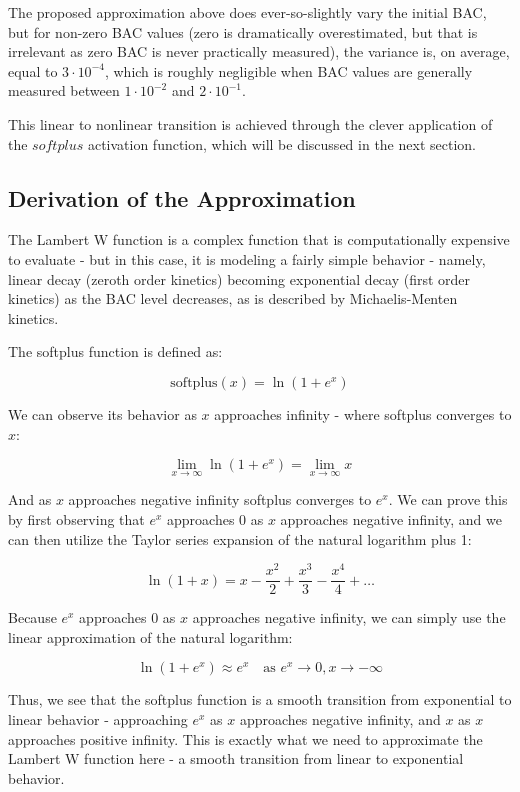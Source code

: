 \documentclass[12pt]{article}
\begin{document}
The proposed approximation above does ever-so-slightly vary the initial BAC, but for non-zero BAC values (zero is dramatically overestimated, but that is irrelevant as zero BAC is never practically measured), the variance is, on average, equal to $3 \cdot 10^{-4}$, which is roughly negligible when BAC values are generally measured between $1 \cdot 10^{-2}$ and $2 \cdot 10^{-1}$.

This linear to nonlinear transition is achieved through the clever application of the $softplus$ activation function, which will be discussed in the next section.

\subsection {Derivation of the Approximation}

The Lambert W function is a complex function that is computationally expensive to evaluate - but in this case, it is modeling a fairly simple behavior - namely, linear decay (zeroth order kinetics) becoming exponential decay (first order kinetics) as the BAC level decreases, as is described by Michaelis-Menten kinetics.

The softplus function is defined as:

\[
    \mathrm{softplus}(x) = \ln(1 + e^x)
\]

We can observe its behavior as $x$ approaches infinity - where softplus converges to $x$:

\[
    \lim_{x \to \infty} \ln(1 + e^x) = \lim_{x \to \infty} x
\]

And as $x$ approaches negative infinity softplus converges to $e^x$. We can prove this by first observing that $e^x$ approaches 0 as $x$ approaches negative infinity, and we can then utilize the Taylor series expansion of the natural logarithm plus 1:

\[
    \ln(1 + x) = x - \frac{x^2}{2} + \frac{x^3}{3} - \frac{x^4}{4} + \ldots
\]

Because $e^x$ approaches 0 as $x$ approaches negative infinity, we can simply use the linear approximation of the natural logarithm:

\[
    \ln(1 + e^x) \approx e^x \quad \text{as } e^x \to 0, x \to -\infty
\]

Thus, we see that the softplus function is a smooth transition from exponential to linear behavior - approaching $e^x$ as $x$ approaches negative infinity, and $x$ as $x$ approaches positive infinity. This is exactly what we need to approximate the Lambert W function here - a smooth transition from linear to exponential behavior.
\end{document}
